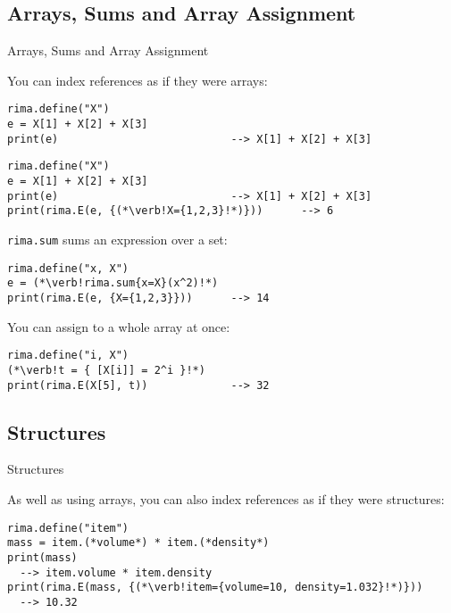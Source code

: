 \documentclass[smaller]{beamer}
\begin{document}
\subsection{Arrays, Sums and Array Assignment}
\begin{frame}[fragile]{Arrays, Sums and Array Assignment}

  You can index references as if they were arrays:%
  \vspace{-2ex}
  \begin{overprint}%
%
  \begin{lstlisting}
rima.define("X")
e = X[1] + X[2] + X[3]
print(e)                           --> X[1] + X[2] + X[3]
  \end{lstlisting}%
%
  \begin{lstlisting}
rima.define("X")
e = X[1] + X[2] + X[3]
print(e)                           --> X[1] + X[2] + X[3]
print(rima.E(e, {(*\verb!X={1,2,3}!*)}))      --> 6
  \end{lstlisting}
%  
  \end{overprint} 
  \pause\pause
  \vspace{-1ex}

  \lstinline!rima.sum! sums an expression over a set:
  \begin{lstlisting}
rima.define("x, X")
e = (*\verb!rima.sum{x=X}(x^2)!*)
print(rima.E(e, {X={1,2,3}}))      --> 14
  \end{lstlisting}
  \pause

  You can assign to a whole array at once:
  \begin{lstlisting}
rima.define("i, X")
(*\verb!t = { [X[i]] = 2^i }!*)
print(rima.E(X[5], t))             --> 32
  \end{lstlisting}

\end{frame}


\subsection{Structures}
\begin{frame}[fragile]{Structures}

  As well as using arrays, you can also index references as if they were structures:
  \begin{lstlisting}
rima.define("item")
mass = item.(*volume*) * item.(*density*)
print(mass)
  --> item.volume * item.density
print(rima.E(mass, {(*\verb!item={volume=10, density=1.032}!*)}))
  --> 10.32
  \end{lstlisting}
\end{frame}
\end{document}
